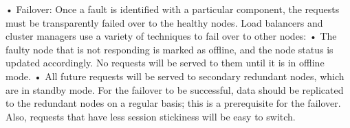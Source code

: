 • Failover: Once a fault is identified with a particular component, the requests must be transparently failed over to the healthy nodes. Load balancers and cluster managers use a variety of techniques to fail over to other nodes:
• The faulty node that is not responding is marked as offline, and the node status is updated accordingly. No requests will be served to them until it is in offline mode.
• All future requests will be served to secondary redundant nodes, which are in standby mode.
For the failover to be successful, data should be replicated to the redundant nodes on a regular basis; this is a prerequisite for the failover. Also, requests that have less session stickiness will be easy to switch.









